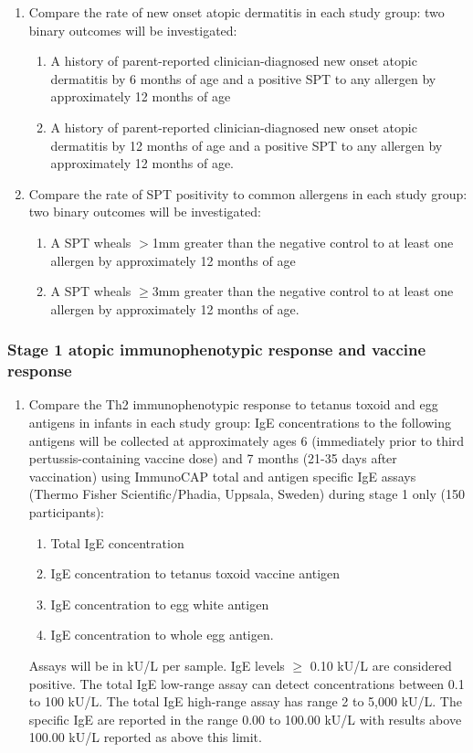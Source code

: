 \documentclass{bmcart}
\begin{document}
\begin{enumerate}
	\item Compare the rate of new onset atopic dermatitis in each study group:
	two binary outcomes will be investigated:
	\begin{enumerate}
		\item A history of parent-reported clinician-diagnosed new onset atopic dermatitis by 6 months of age and a positive SPT to any allergen by approximately 12 months of age
		\item A history of parent-reported clinician-diagnosed new onset atopic dermatitis by 12 months of age and a positive SPT to any allergen by approximately 12 months of age.
	\end{enumerate}
	\item Compare the rate of SPT positivity to common allergens in each study group:
	two binary outcomes will be investigated:
	\begin{enumerate}
		\item A SPT wheals $>$1mm greater than the negative control to at least one allergen by approximately 12 months of age
		\item A SPT wheals $\geq$3mm greater than the negative control to at least one allergen by approximately 12 months of age.
	\end{enumerate}
\end{enumerate}

\subsubsection*{Stage 1 atopic immunophenotypic response and vaccine response}

\begin{enumerate}[resume]
	\item Compare the Th2 immunophenotypic response to tetanus toxoid and egg antigens in infants in each study group:
	IgE concentrations to the following antigens will be collected at approximately ages 6 (immediately prior to third pertussis-containing vaccine dose) and 7 months (21-35 days after vaccination) using ImmunoCAP total and antigen specific IgE assays (Thermo Fisher Scientific/Phadia, Uppsala, Sweden) during stage 1 only (150 participants):
	\begin{enumerate}
		\item Total IgE concentration
		\item IgE concentration to tetanus toxoid vaccine antigen
		\item IgE concentration to egg white antigen
		\item IgE concentration to whole egg antigen.
	\end{enumerate}
	Assays will be in kU/L per sample.
	IgE levels $\geq$ 0.10 kU/L are considered positive.
	The total IgE low-range assay can detect concentrations between 0.1 to 100 kU/L.
	The total IgE high-range assay has range 2 to 5,000 kU/L.
	The specific IgE are reported in the range 0.00 to 100.00 kU/L with results above 100.00 kU/L reported as above this limit.
\end{enumerate}
\end{document}
